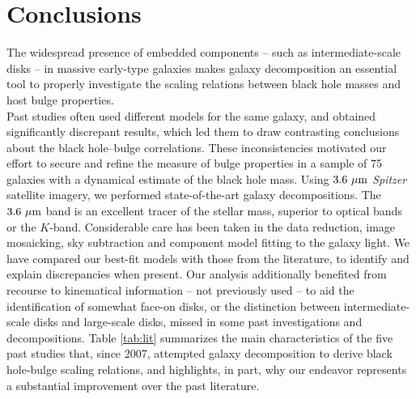 \documentclass[preprint2]{emulateapj}
\begin{document}
\section{Conclusions}
\label{sec:concl}
The widespread presence of embedded components -- such as intermediate-scale disks -- in massive early-type galaxies 
makes galaxy decomposition an essential tool to properly investigate the scaling relations between black hole masses 
and host bulge properties. \\
Past studies often used different models for the same galaxy, and obtained significantly discrepant results,  
which led them to draw contrasting conclusions about the black hole--bulge correlations.
These inconsistencies motivated our effort to secure and refine the measure of bulge properties in a sample of 75 galaxies 
with a dynamical estimate of the black hole mass. 
Using $3.6~\rm \mu m$ \emph{Spitzer} satellite imagery, 
we performed state-of-the-art galaxy decompositions. 
The $3.6~\rm \mu m$ band is an excellent tracer of the stellar mass, superior to optical bands or the $K$-band. 
Considerable care has been taken in the data reduction, image mosaicking, sky subtraction and component model fitting to the galaxy light.
We have compared our best-fit models with those from the literature, 
to identify and explain discrepancies when present. 
Our analysis additionally benefited from recourse to kinematical information -- not previously used -- to aid the identification of 
somewhat face-on disks, or the distinction between intermediate-scale disks and large-scale disks, 
missed in some past investigations and decompositions.
Table \ref{tab:lit} summarizes the main characteristics of the five past studies that, since 2007, attempted galaxy decomposition 
to derive black hole-bulge scaling relations, 
and highlights, in part, why our endeavor represents a substantial improvement over the past literature.
\end{document}
